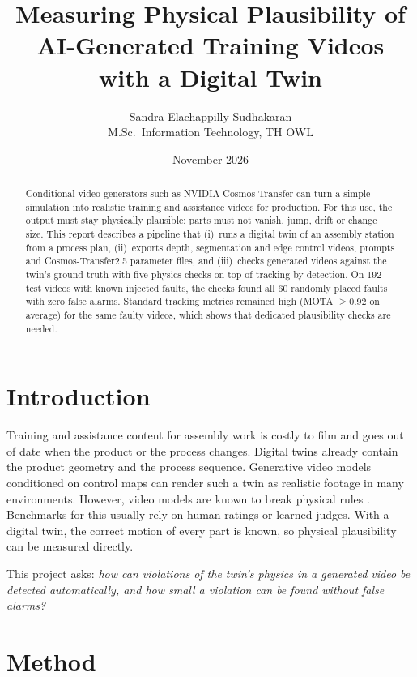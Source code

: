 \documentclass[11pt,a4paper]{article}
\title{Measuring Physical Plausibility of AI-Generated Training Videos\\with a Digital Twin}
\author{Sandra Elachappilly Sudhakaran\\\small M.Sc.\ Information Technology, TH OWL}
\date{November 2026}
\begin{document}
\maketitle

\begin{abstract}
Conditional video generators such as NVIDIA Cosmos-Transfer can turn a simple
simulation into realistic training and assistance videos for production. For
this use, the output must stay physically plausible: parts must not vanish,
jump, drift or change size. This report describes a pipeline that (i)~runs a
digital twin of an assembly station from a process plan, (ii)~exports depth,
segmentation and edge control videos, prompts and Cosmos-Transfer2.5 parameter
files, and (iii)~checks generated videos against the twin's ground truth with five
physics checks on top of tracking-by-detection. On 192 test videos with
known injected faults, the checks found all 60 randomly placed faults with zero
false alarms. Standard tracking metrics remained high (MOTA $\geq 0.92$ on
average) for the same faulty videos, which shows that dedicated plausibility checks are needed.
\end{abstract}

\section{Introduction}
Training and assistance content for assembly work is costly to film and goes out of date
when the product or the process changes. Digital twins already contain the product geometry and
the process sequence. Generative video models conditioned on control maps
\cite{cosmos2025,cosmostransfer2025,cosmostransfer25} can render such a twin
as realistic footage in many environments. However, video models are known to break physical
rules \cite{videophy2024,physicsiq2025}. Benchmarks for this usually rely on human ratings
or learned judges. With a digital twin, the correct motion of every part is
known, so physical plausibility can be measured directly.

This project asks: \emph{how can violations of the twin's physics in a generated video be detected
automatically, and how small a violation can be found without false alarms?}

\section{Method}
\end{document}
